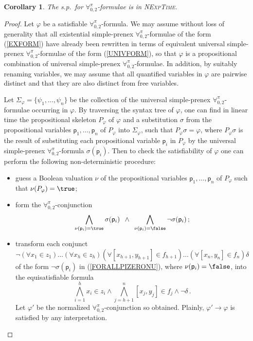 \documentclass[submission,copyright,creativecommons]{eptcs}
\newtheorem{corollary}{Corollary}
\newcommand{\Lang}{\ensuremath{\mathbf{\forall}^{\pi}_{0,2}}\xspace}
\newcommand{\svx}{x}
\newcommand{\svy}{y}
\newcommand{\svz}{z}
\newcommand{\mvx}{f}
\begin{document}
\begin{corollary}
    \label{corollaryLangFormulae}
    The s.p.\ for \Lang-formulae is in \textsc{NExpTime}.
\end{corollary}
\begin{proof}
Let $\varphi$ be a satisfiable \Lang-formula.  We may assume without
loss of generality that all existential simple-prenex \Lang-formulae
of the form (\ref{EXFORM}) have already been rewritten in terms of
equivalent universal simple-prenex \Lang-formulae of the form
(\ref{UNIVFORM}), so that $\varphi$ is a propositional combination of
universal simple-prenex \Lang-formulae.  In addition, by suitably
renaming variables, we may assume that all quantified variables in
$\varphi$ are pairwise distinct and that they are also distinct from
free variables.

Let $\Sigma_{\varphi}=\{\psi_1, \ldots, \psi_n\}$ be the collection of
the universal simple-prenex \Lang-formulae occurring in $\varphi$.  By
traversing the syntax tree of $\varphi$, one can find in linear time
the propositional skeleton $P_{\varphi}$ of $\varphi$ and a
substitution $\sigma$ from the propositional variables
$\mathsf{p}_{1}, \ldots, \mathsf{p}_{n}$ of $P_{\varphi}$ into
$\Sigma_{\varphi}$, such that $P_{\varphi} \sigma = \varphi$, where
$P_{\varphi} \sigma$ is the result of substituting each propositional
variable $\mathsf{p}_{i}$ in $P_{\varphi}$ by the universal
simple-prenex \Lang-formula $\sigma(\mathsf{p}_{i})$.  Then to check
the satisfiability of $\varphi$ one can perform the following
non-deterministic procedure:
\begin{itemize}
    \item guess a Boolean valuation $\nu$ of the propositional 
    variables $\mathsf{p}_{1}, \ldots, \mathsf{p}_{n}$ of 
    $P_{\varphi}$ such that $\nu(P_{\varphi}) = \true$;
    
    \item form the \Lang-conjunction
    \begin{equation}\label{FORALLPIZERONU}
    \bigwedge_{\nu(\mathsf{p}_{i}) = \true}
    \sigma(\mathsf{p}_{i}) 
\,\,\, \wedge \,\,\,
\bigwedge_{\nu(\mathsf{p}_{i}) = \false}
    \neg\sigma(\mathsf{p}_{i}) \,;
    \end{equation}
    
    \item transform each conjunct 
    \[
    \neg (\forall \svx_1 \in \svz_1) \ldots (\forall \svx_h \in
    \svz_h)(\forall [\svx_{h+1}, \svy_{h+1}] \in
    \mvx_{h+1})\ldots(\forall [\svx_n, \svy_n] \in \mvx_n)\delta
    \]
    of the form $\neg\sigma(\mathsf{p}_{i})$ in
    (\ref{FORALLPIZERONU}), where $\nu(\mathsf{p}_{i}) = \false$, into
    the equisatisfiable formula
    \[
\bigwedge_{i=1}^{h} \svx_i \in \svz_i 
    \wedge \bigwedge_{j=h+1}^{n} [\svx_j, \svy_j] \in \mvx_j
    \wedge \neg \delta \,.
\]
Let $\varphi'$ be the
    normalized \Lang-conjunction so obtained. Plainly, $\varphi' 
    \rightarrow \varphi$ is satisfied by any interpretation.
        



\end{itemize}
\end{proof}
\end{document}
